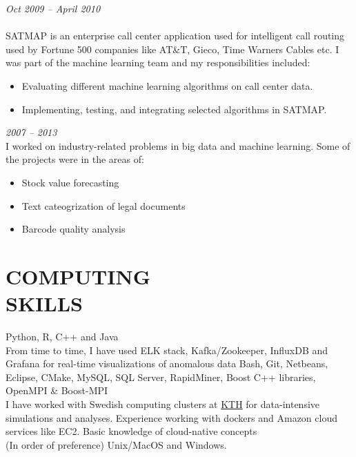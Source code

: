 \documentclass[margin, 10pt]{res} %
\begin{document}
\begin{resume}
{\sl {}} \hfill \textit{Oct 2009 -- April 2010} \\
{\href{http://www.satmapinc.com/}{\color{RubineRed}{Afiniti (formerly TRG SATMAP), Machine Learning Team, Pakistan}}}  \\
SATMAP is an enterprise call center application used for intelligent call routing used by Fortune 500 companies like AT\&T, Gieco, Time Warners Cables etc. I was part of the machine learning team and my responsibilities included:

\begin{itemize} \itemsep -2pt %
\item Evaluating different machine learning algorithms on call center data. 
\item Implementing, testing, and integrating selected algorithms in SATMAP. 
\end{itemize}
 
{\sl \textbf{}} \hfill \textit{2007 -- 2013} \\
I worked on industry-related problems in big data and machine learning. Some of the projects were in the areas of:
\begin{itemize}
    \item Stock value forecasting
    \item Text cateogrization of legal documents
    \item Barcode quality analysis
\end{itemize}


\section{COMPUTING \\ SKILLS} 

{\bf \color{Brown}{Languages:}} 
Python, R, C++ and Java\\
{\bf \color{Brown}{Data/Streaming pipelines:}} From time to time, I have used ELK stack, Kafka/Zookeeper, InfluxDB and Grafana for real-time visualizations of anomalous data
{\bf \color{Brown}{Misc Tools:}} Bash, Git, Netbeans, Eclipse, CMake, MySQL, SQL Server, RapidMiner, Boost C++ libraries, OpenMPI \& Boost-MPI \\
{\bf \color{Brown}{Cluster/Cloud infrastructure:}} I have worked with Swedish computing clusters at \href{https://www.pdc.kth.se/hpc-services/computing-systems}{KTH} for data-intensive simulations and analyses. 
Experience working with dockers and Amazon cloud services like EC2. Basic knowledge of cloud-native concepts \\
{\bf \color{Brown}{Operating Systems:}} (In order of preference) Unix/MacOS and Windows.


\end{resume}
\end{document}
